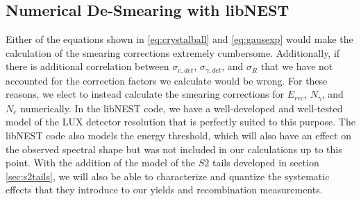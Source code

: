 \subsection{Numerical De-Smearing with libNEST}\label{sec:desmearprelim}
Either of the equations shown in \ref{eq:crystalball} and \ref{eq:gausexp} would make the calculation of the smearing corrections extremely cumbersome. Additionally, if there is additional correlation between $\sigma_{e,det}$, $\sigma_{\gamma,det}$, and $\sigma_{R}$ that we have not accounted for the correction factors we calculate would be wrong. For these reasons, we elect to instead calculate the smearing corrections for $E_{rec}$, $N_{\gamma}$, and $N_{e}$ numerically. In the libNEST code, we have a well-developed and well-tested model of the LUX detector resolution that is perfectly suited to this purpose. The libNEST code also models the energy threshold, which will also have an effect on the observed spectral shape but was not included in our calculations up to this point. With the addition of the model of the $S2$ tails developed in section \ref{sec:s2tails}, we will also be able to characterize and quantize the systematic effects that they introduce to our yields and recombination measurements.

